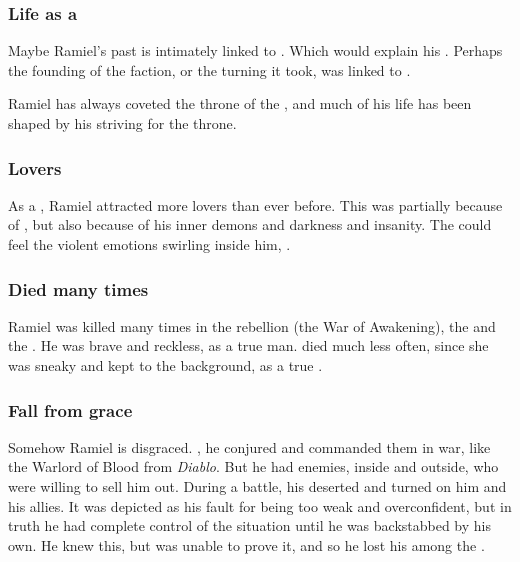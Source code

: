 \subsubsection{Life as a \sathariah}
Maybe Ramiel's past is intimately linked to \Cuezca. 
Which would explain his . 
Perhaps the founding of the \Mystraacht{} faction, or the turning it took, was linked to \Cuezca. 

Ramiel has always coveted the throne of the \Mystraacht{} \apex{}, and much of his life has been shaped by his striving for the throne. 





\subsubsection{Lovers}
As a \sathariah, Ramiel attracted more \resvil lovers than ever before.
This was partially because of , but also because of his inner demons and darkness and insanity.
The \resviel could feel the violent emotions swirling inside him, .






\subsubsection{Died many times}
Ramiel was killed many times in the rebellion (the War of Awakening), the \secondbanewar and the \resphanwars. 
He was brave and reckless, as a true \resphan man.
\Shiaraid died much less often, since she was sneaky and kept to the background, as a true \resvil.





\subsubsection{Fall from grace}
Somehow Ramiel is disgraced. 
, he conjured \daemons{} and commanded them in war, like the Warlord of Blood from \emph{Diablo}. 
But he had enemies, inside \Mystraacht{} and outside, who were willing to sell him out. 
During a battle, his \daemons{} deserted and turned on him and his allies. 
It was depicted as his fault for being too weak and overconfident, but in truth he had complete control of the situation until he was backstabbed by his own. 
He knew this, but was unable to prove it, and so he lost his \honour among the \resphain. 





